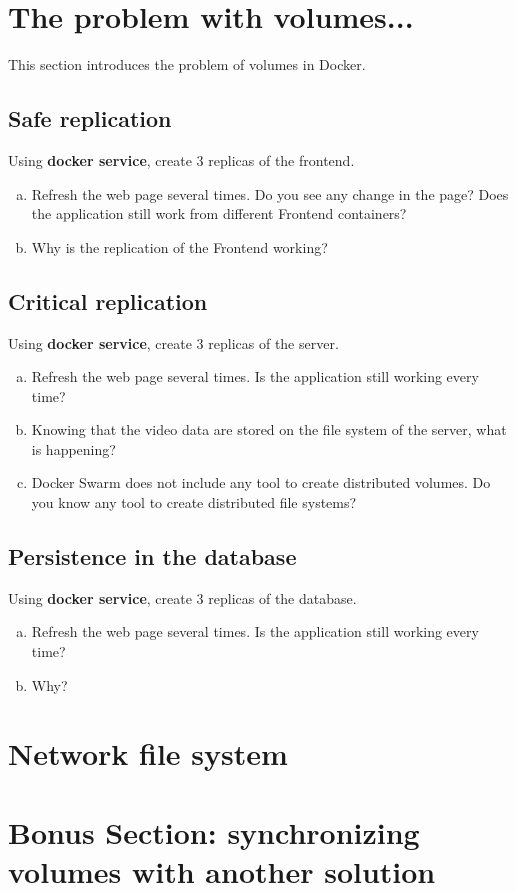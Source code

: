 \documentclass[a4paper,11pt]{exam}
\begin{document}
\section{The problem with volumes...}

This section introduces the problem of volumes in Docker.

\subsection{Safe replication}

\begin{questions}
	\question Using \textbf{docker service}, create 3 replicas of the frontend.
	\begin{enumerate}[(a)]
		\item Refresh the web page several times. Do you see any change in the page? Does the application still work from different Frontend containers?
		\item Why is the replication of the Frontend working?
	\end{enumerate}
\end{questions}

\subsection{Critical replication}

\begin{questions}
	\question Using \textbf{docker service}, create 3 replicas of the server.
	\begin{enumerate}[(a)]
		\item Refresh the web page several times. Is the application still working every time?
		\item Knowing that the video data are stored on the file system of the server, what is happening?
		\item Docker Swarm does not include any tool to create distributed volumes. Do you know any tool to create distributed file systems?
	\end{enumerate}
\end{questions}

\subsection{Persistence in the database}

\begin{questions}
	\question Using \textbf{docker service}, create 3 replicas of the database.
	\begin{enumerate}[(a)]
		\item Refresh the web page several times. Is the application still working every time?
		\item Why?
	\end{enumerate}
\end{questions}

\clearpage

\section{Network file system}



\section{Bonus Section: synchronizing volumes with another solution}
\end{document}
